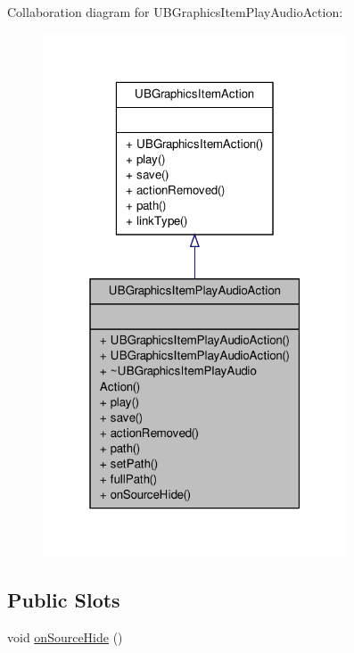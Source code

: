 Collaboration diagram for U\-B\-Graphics\-Item\-Play\-Audio\-Action\-:
\nopagebreak
\begin{figure}[H]
\begin{center}
\leavevmode
\includegraphics[width=256pt]{de/d68/class_u_b_graphics_item_play_audio_action__coll__graph}
\end{center}
\end{figure}
\subsection*{Public Slots}
\begin{DoxyCompactItemize}
\item 
void \hyperlink{class_u_b_graphics_item_play_audio_action_abbc4cedaaac8f90ba66b418b179324e5}{on\-Source\-Hide} ()
\end{DoxyCompactItemize}
